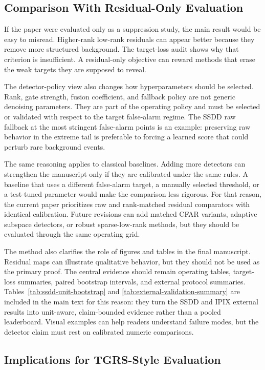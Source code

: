 \documentclass[journal]{IEEEtran}
\begin{document}
\subsection{Comparison With Residual-Only Evaluation}

If the paper were evaluated only as a suppression study, the main result would be easy to misread. Higher-rank low-rank residuals can appear better because they remove more structured background. The target-loss audit shows why that criterion is insufficient. A residual-only objective can reward methods that erase the weak targets they are supposed to reveal.

The detector-policy view also changes how hyperparameters should be selected. Rank, gate strength, fusion coefficient, and fallback policy are not generic denoising parameters. They are part of the operating policy and must be selected or validated with respect to the target false-alarm regime. The SSDD raw fallback at the most stringent false-alarm points is an example: preserving raw behavior in the extreme tail is preferable to forcing a learned score that could perturb rare background events.

The same reasoning applies to classical baselines. Adding more detectors can strengthen the manuscript only if they are calibrated under the same rules. A baseline that uses a different false-alarm target, a manually selected threshold, or a test-tuned parameter would make the comparison less rigorous. For that reason, the current paper prioritizes raw and rank-matched residual comparators with identical calibration. Future revisions can add matched CFAR variants, adaptive subspace detectors, or robust sparse-low-rank methods, but they should be evaluated through the same operating grid.

The method also clarifies the role of figures and tables in the final manuscript. Residual maps can illustrate qualitative behavior, but they should not be used as the primary proof. The central evidence should remain operating tables, target-loss summaries, paired bootstrap intervals, and external protocol summaries. Tables~\ref{tab:ssdd-unit-bootstrap} and \ref{tab:external-validation-summary} are included in the main text for this reason: they turn the SSDD and IPIX external results into unit-aware, claim-bounded evidence rather than a pooled leaderboard. Visual examples can help readers understand failure modes, but the detector claim must rest on calibrated numeric comparisons.

\subsection{Implications for TGRS-Style Evaluation}
\end{document}
